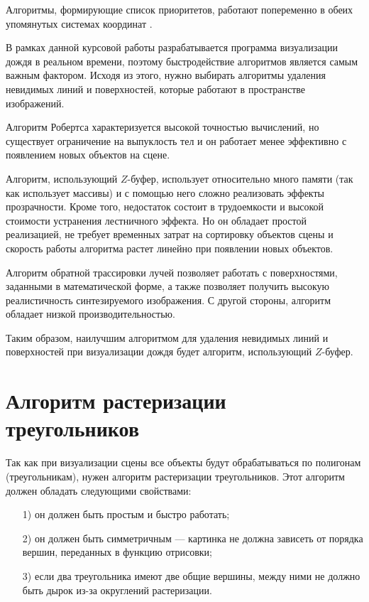 Алгоритмы, формирующие список приоритетов, работают попеременно в обеих упомянутых системах координат \cite{Demin2005}.

В рамках данной курсовой работы разрабатывается программа визуализации дождя в реальном времени, поэтому быстродействие алгоритмов является самым важным фактором. Исходя из этого, нужно выбирать алгоритмы удаления невидимых линий и поверхностей, которые работают в пространстве изображений.

Алгоритм Робертса характеризуется высокой точностью вычислений, но существует ограничение на выпуклость тел и он работает менее эффективно с появлением новых объектов на сцене.

Алгоритм, использующий $Z$-буфер, использует относительно много памяти (так как использует массивы) и с помощью него сложно реализовать эффекты прозрачности. 
Кроме того, недостаток состоит в трудоемкости и высокой стоимости устранения лестничного эффекта. 
Но он обладает простой реализацией, не требует временных затрат на сортировку объектов сцены и скорость работы алгоритма растет линейно при появлении новых объектов.

Алгоритм обратной трассировки лучей позволяет работать с поверхностями, заданными в математической форме, а также позволяет получить высокую реалистичность синтезируемого изображения. 
С другой стороны, алгоритм обладает низкой производительностью.

Таким образом, наилучшим алгоритмом для удаления невидимых линий и поверхностей при визуализации дождя будет алгоритм, использующий $Z$-буфер.

\section{Алгоритм растеризации треугольников}

Так как при визуализации сцены все объекты будут обрабатываться по полигонам (треугольникам), нужен алгоритм растеризации треугольников. 
Этот алгоритм должен обладать следующими свойствами:
\begin{enumerate}
\item[1)] он должен быть простым и быстро работать;
\item[2)] он должен быть симметричным --- картинка не должна зависеть от порядка вершин, переданных в функцию отрисовки;
\item[3)] если два треугольника имеют две общие вершины, между ними не должно быть дырок из-за округлений растеризации.
\end{enumerate}

